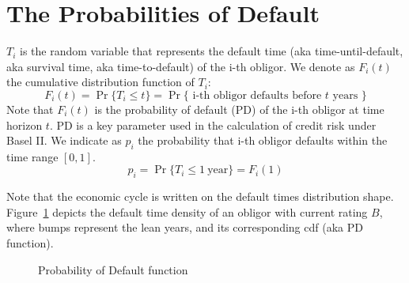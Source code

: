 \documentclass[11pt,fleqn]{book} %
\begin{document}
\section{The Probabilities of Default}
\label{ap:pd}

\begin{definition}
	$T_i$ is the random variable that represents the default time 
	(aka time-until-default, aka survival time, aka time-to-default) of the 
	i-th obligor. We denote as $F_i(t)$ the cumulative distribution function 
	of $T_i$:
	\begin{displaymath}
		F_i(t) = \Pr\{T_i \le t\} = 
		\Pr\{\text{ i-th obligor defaults before $t$ years }\}
	\end{displaymath}
	Note that $F_i(t)$ is the probability of default (PD) of the i-th obligor
	at time horizon $t$. PD is a key parameter used in the calculation of credit 
	risk under Basel II\@. We indicate as $p_i$ the probability that i-th obligor 
	defaults within the time range $[0,1]$.
	\begin{displaymath}
		p_i = \Pr\{T_i \le 1\ \text{year}\} = F_i(1) 
	\end{displaymath}
\end{definition}

Note that the economic cycle is written on the default times distribution shape.
Figure~\ref{fig:dprob} depicts the default time density of an obligor with 
current rating $B$, where bumps represent the lean years, and its corresponding 
cdf (aka PD function).

\begin{figure}[!ht]
	\centering
	\caption{Probability of Default function}
	\label{fig:dprob}
\end{figure}
\end{document}
